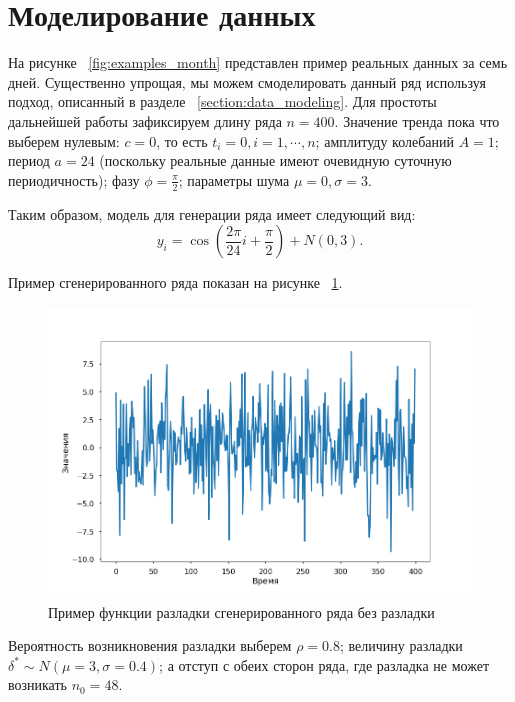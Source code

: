 \documentclass[%
12pt,
master,  %
natbib,      %
subf,        %
substylefile = spbu.rtx,
href,        %
colorlinks,  %
]{disser}
\begin{document}
\section{Моделирование данных}

На рисунке ~\ref{fig:examples_month} представлен пример реальных данных за семь дней. Существенно упрощая, мы можем смоделировать данный ряд используя подход, описанный в разделе ~\ref{section:data_modeling}. Для простоты дальнейшей работы зафиксируем длину ряда $n = 400$. Значение тренда пока что выберем нулевым: $c = 0$, то есть $t_i = 0, i = 1,\cdots, n$; амплитуду колебаний $A = 1$; период $ a = 24 $ (поскольку реальные данные имеют очевидную суточную периодичность); фазу $\phi = \frac{\pi}{2}$; параметры шума $\mu = 0, \sigma = 3$.

Таким образом, модель для генерации ряда имеет следующий вид:
\begin{equation*} y_i = \cos(\frac{2\pi}{24}i + \frac{\pi}{2}) + N(0,3).\end{equation*}

Пример сгенерированного ряда показан на рисунке ~\ref{fig:data_modeling_example_1}.

\begin{figure}[!hhh]
	\begin{center}
		\includegraphics[width=12cm]{data_modeling_example_1}
	\end{center}
	\vspace{-5mm}\caption{Пример функции разладки сгенерированного ряда без разладки}
	\label{fig:data_modeling_example_1}
\end{figure}

Вероятность возникновения разладки выберем $\rho = 0.8$; величину разладки $\delta^* \sim N(\mu = 3,\sigma = 0.4)$; а отступ с обеих сторон ряда, где разладка не может возникать $n_0 = 48$.
\end{document}
